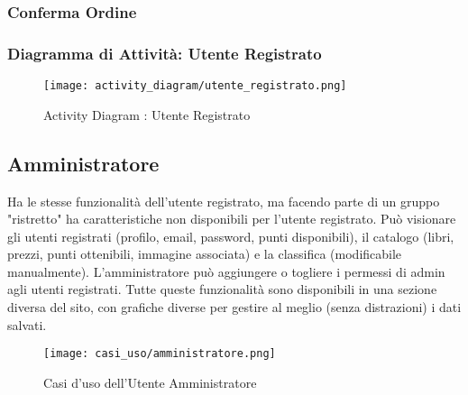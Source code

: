 \documentclass[a4paper, 10pt]{article}
\begin{document}
		\subsubsection{Conferma Ordine}
		\newpage
		\subsubsection{Diagramma di Attività: Utente Registrato}
		\begin{figure}[h]
				\centering
				\texttt{[image: activity\_diagram/utente\_registrato.png]}
				\caption{Activity Diagram : Utente Registrato}
		\end{figure}
		\clearpage 
		\newpage
		\subsection{Amministratore}
		Ha le stesse funzionalità dell'utente registrato, ma facendo parte di un gruppo "ristretto"
		ha caratteristiche non disponibili per l'utente registrato. Può visionare
		gli utenti registrati (profilo, email, password, punti disponibili), 
		il catalogo (libri, prezzi, punti ottenibili, immagine associata) e la classifica 
		(modificabile manualmente). L'amministratore può aggiungere o togliere i permessi di admin 
		agli utenti registrati. Tutte queste funzionalità sono disponibili in una sezione diversa 
		del sito, con grafiche diverse per gestire al meglio (senza distrazioni) i dati salvati.
		\begin{figure}[h]
				\centering
				\texttt{[image: casi\_uso/amministratore.png]}
				\caption{Casi d'uso dell'Utente Amministratore}
		\end{figure}
		\clearpage
\end{document}
